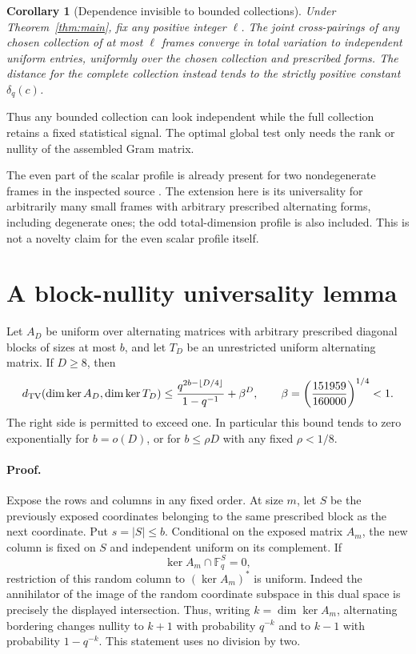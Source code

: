 \documentclass[11pt,letterpaper]{article}
\newtheorem{corollary}[theorem]{Corollary}
\begin{document}
\begin{corollary}[Dependence invisible to bounded collections]\label{cor:local}
Under Theorem~\ref{thm:main}, fix any positive integer $\ell$. The joint
cross-pairings of any chosen collection of at most $\ell$ frames converge
in total variation to independent uniform entries, uniformly over the
chosen collection and prescribed forms. The distance for the complete
collection instead tends to the strictly positive constant $\delta_q(c)$.
\end{corollary}

Thus any bounded collection can look independent while the full collection
retains a fixed statistical signal. The optimal global test only needs the
rank or nullity of the assembled Gram matrix.

The even part of the scalar profile is already present for two
nondegenerate frames in the inspected source \cite{SourceProfile}.
The extension here is its universality for arbitrarily many small frames
with arbitrary prescribed alternating forms, including degenerate ones;
the odd total-dimension profile is also included. This is not a novelty
claim for the even scalar profile itself.

\section{A block-nullity universality lemma}

Let $A_D$ be uniform over alternating matrices with arbitrary prescribed
diagonal blocks of sizes at most $b$, and let $T_D$ be an unrestricted
uniform alternating matrix. If $D\ge8$, then
\begin{equation}\label{cw:eq:nullity-bound}
 d_{\rm TV}(\dim\ker A_D,\dim\ker T_D)
 \le \frac{q^{2b-\lfloor D/4\rfloor}}{1-q^{-1}}+\beta^D,
 \qquad
 \beta=\left(\frac{151959}{160000}\right)^{1/4}<1.
\end{equation}
The right side is permitted to exceed one. In particular this bound tends
to zero exponentially for $b=o(D)$, or for $b\le\rho D$ with any fixed
$\rho<1/8$.

\paragraph{Proof.}
Expose the rows and columns in any fixed order. At size $m$, let $S$ be
the previously exposed coordinates belonging to the same prescribed block
as the next coordinate. Put $s=|S|\le b$. Conditional on the exposed
matrix $A_m$, the new column is fixed on $S$ and independent uniform on
its complement. If
\[
 \ker A_m\cap\mathbb F_q^S=0,
\]
restriction of this random column to $(\ker A_m)^*$ is uniform. Indeed
the annihilator of the image of the random coordinate subspace in this
dual space is precisely the displayed intersection. Thus, writing
$k=\dim\ker A_m$, alternating bordering changes nullity to $k+1$ with
probability $q^{-k}$ and to $k-1$ with probability $1-q^{-k}$.
This statement uses no division by two.
\end{document}
